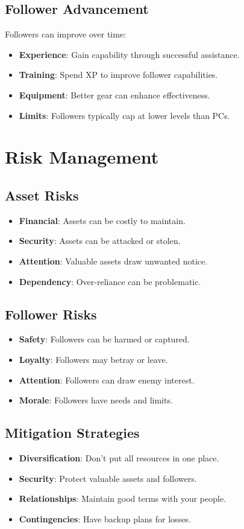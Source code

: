 \subsection*{Follower Advancement}
Followers can improve over time:
\begin{itemize}
\item \textbf{Experience}: Gain capability through successful assistance.
\item \textbf{Training}: Spend XP to improve follower capabilities.
\item \textbf{Equipment}: Better gear can enhance effectiveness.
\item \textbf{Limits}: Followers typically cap at lower levels than PCs.
\end{itemize}

\section{Risk Management}

\subsection*{Asset Risks}
\begin{itemize}
\item \textbf{Financial}: Assets can be costly to maintain.
\item \textbf{Security}: Assets can be attacked or stolen.
\item \textbf{Attention}: Valuable assets draw unwanted notice.
\item \textbf{Dependency}: Over-reliance can be problematic.
\end{itemize}

\subsection*{Follower Risks}
\begin{itemize}
\item \textbf{Safety}: Followers can be harmed or captured.
\item \textbf{Loyalty}: Followers may betray or leave.
\item \textbf{Attention}: Followers can draw enemy interest.
\item \textbf{Morale}: Followers have needs and limits.
\end{itemize}

\subsection*{Mitigation Strategies}
\begin{itemize}
\item \textbf{Diversification}: Don't put all resources in one place.
\item \textbf{Security}: Protect valuable assets and followers.
\item \textbf{Relationships}: Maintain good terms with your people.
\item \textbf{Contingencies}: Have backup plans for losses.
\end{itemize}

